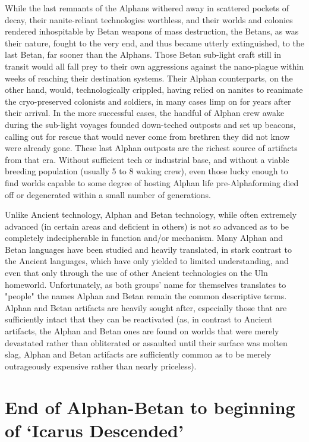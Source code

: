 While the last remnants of the Alphans withered away in scattered
pockets of decay, their nanite-reliant technologies worthless, and
their worlds and colonies rendered inhospitable by Betan weapons of
mass destruction, the Betans, as was their nature, fought to the very
end, and thus became utterly extinguished, to the last Betan, far
sooner than the Alphans. Those Betan sub-light craft still in transit
would all fall prey to their own aggressions against the nano-plague
within weeks of reaching their destination systems. Their Alphan
counterparts, on the other hand, would, technologically crippled,
having relied on nanites to reanimate the cryo-preserved colonists and
soldiers, in many cases limp on for years after their arrival. In the
more successful cases, the handful of Alphan crew awake during the
sub-light voyages founded down-teched outposts and set up beacons,
calling out for rescue that would never come from brethren they did
not know were already gone. These last Alphan outposts are the richest
source of artifacts from that era. Without sufficient tech or
industrial base, and without a viable breeding population (usually 5
to 8 waking crew), even those lucky enough to find worlds capable to
some degree of hosting Alphan life pre-Alphaforming died off or
degenerated within a small number of generations.

Unlike Ancient technology, Alphan and Betan technology, while often
extremely advanced (in certain areas and deficient in others) is not
so advanced as to be completely indecipherable in function and/or
mechanism. Many Alphan and Betan languages have been studied and
heavily translated, in stark contrast to the Ancient languages, which
have only yielded to limited understanding, and even that only through
the use of other Ancient technologies on the Uln
homeworld. Unfortunately, as both groups' name for themselves
translates to "people" the names Alphan and Betan remain the common
descriptive terms. Alphan and Betan artifacts are heavily sought
after, especially those that are sufficiently intact that they can be
reactivated (as, in contrast to Ancient artifacts, the Alphan and
Betan ones are found on worlds that were merely devastated rather than
obliterated or assaulted until their surface was molten slag, Alphan
and Betan artifacts are sufficiently common as to be merely
outrageously expensive rather than nearly priceless).

\section{End of Alphan-Betan to beginning of `Icarus Descended'}
